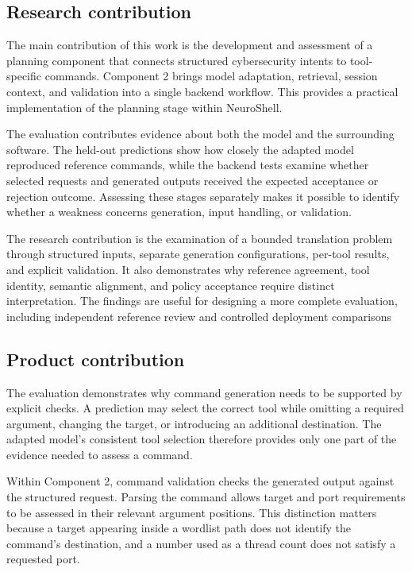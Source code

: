 \documentclass[
]{article}
\begin{document}
\hypertarget{research-contribution}{%
\subsection{Research contribution}\label{research-contribution}}

The main contribution of this work is the development and assessment of
a planning component that connects structured cybersecurity intents to
tool-specific commands. Component 2 brings model adaptation, retrieval,
session context, and validation into a single backend workflow. This
provides a practical implementation of the planning stage within
NeuroShell.

The evaluation contributes evidence about both the model and the
surrounding software. The held-out predictions show how closely the
adapted model reproduced reference commands, while the backend tests
examine whether selected requests and generated outputs received the
expected acceptance or rejection outcome. Assessing these stages
separately makes it possible to identify whether a weakness concerns
generation, input handling, or validation.

The research contribution is the examination of a bounded translation
problem through structured inputs, separate generation configurations,
per-tool results, and explicit validation. It also demonstrates why
reference agreement, tool identity, semantic alignment, and policy
acceptance require distinct interpretation. The findings are useful for
designing a more complete evaluation, including independent reference
review and controlled deployment comparisons

\hypertarget{product-contribution}{%
\subsection{\texorpdfstring{ Product
contribution}{ Product contribution}}\label{product-contribution}}

The evaluation demonstrates why command generation needs to be supported
by explicit checks. A prediction may select the correct tool while
omitting a required argument, changing the target, or introducing an
additional destination. The adapted model's consistent tool selection
therefore provides only one part of the evidence needed to assess a
command.

Within Component 2, command validation checks the generated output
against the structured request. Parsing the command allows target and
port requirements to be assessed in their relevant argument positions.
This distinction matters because a target appearing inside a wordlist
path does not identify the command's destination, and a number used as a
thread count does not satisfy a requested port.
\end{document}
